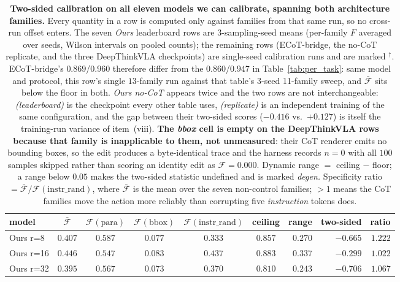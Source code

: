 \documentclass{article}
\begin{document}
\begin{table}[t]
\centering\small
\caption{\textbf{Two-sided calibration on all eleven models we can calibrate, spanning both architecture families.} Every quantity in a row is computed only against families from that same run, so no cross-run offset enters. The seven \emph{Ours} leaderboard rows are 3-sampling-seed means (per-family $F$ averaged over seeds, Wilson intervals on pooled counts); the remaining rows (ECoT-bridge, the no-CoT replicate, and the three DeepThinkVLA checkpoints) are single-seed calibration runs and are marked $^\dagger$. ECoT-bridge's $0.869$/$0.960$ therefore differ from the $0.860$/$0.947$ in Table~\ref{tab:per_task}: same model and protocol, this row's single $13$-family run against that table's 3-seed 11-family sweep, and $\bar{\mathcal{F}}$ sits below the floor in both. \emph{Ours no-CoT} appears twice and the two rows are not interchangeable: \emph{(leaderboard)} is the checkpoint every other table uses, \emph{(replicate)} is an independent training of the same configuration, and the gap between their two-sided scores ($-0.416$ vs.\ $+0.127$) is itself the training-run variance of item~(viii). \textbf{The \emph{bbox} cell is empty on the DeepThinkVLA rows because that family is inapplicable to them, not unmeasured}: their CoT renderer emits no bounding boxes, so the edit produces a byte-identical trace and the harness records $n{=}0$ with all $100$ samples skipped rather than scoring an identity edit as $\mathcal{F}=0.000$. Dynamic range $=$ ceiling $-$ floor; a range below $0.05$ makes the two-sided statistic undefined and is marked \emph{degen.} Specificity ratio $= \bar{\mathcal{F}} / \mathcal{F}(\text{instr\_rand})$, where $\bar{\mathcal{F}}$ is the mean over the seven non-control families; $>\!1$ means the CoT families move the action more reliably than corrupting five \emph{instruction} tokens does.}
\label{tab:calibration}
\begin{tabular}{lcccccrrr}
\toprule
model & $\bar{\mathcal{F}}$ & $\mathcal{F}(\text{para})$ & $\mathcal{F}(\text{bbox})$ & $\mathcal{F}(\text{instr\_rand})$ & ceiling & range & two-sided & ratio \\
\midrule
Ours r=8              & $0.407$ & $0.587$ & $0.077$ & $0.333$ & $0.857$ & $0.270$ & $-0.665$ & $1.222$ \\
Ours r=16             & $0.446$ & $0.547$ & $0.083$ & $0.437$ & $0.883$ & $0.337$ & $-0.299$ & $1.022$ \\
Ours r=32             & $0.395$ & $0.567$ & $0.073$ & $0.370$ & $0.810$ & $0.243$ & $-0.706$ & $1.067$ \\

\end{tabular}
\end{table}
\end{document}
